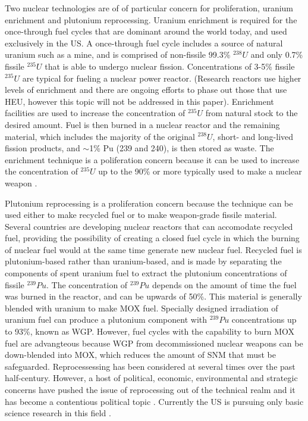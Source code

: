 Two nuclear technologies are of of particular concern for proliferation, uranium enrichment and plutonium reprocessing.  Uranium enrichment is required for the once-through fuel cycles that are dominant around the world today, and used exclusively in the \gls{US}.  A once-through fuel cycle includes a source of natural uranium such as a mine, and is comprised of non-fissile 99.3\% $^{238}U$ and only 0.7\% fissile $^{235}U$ that is able to undergo nuclear fission. Concentrations of 3-5\% fissile $^{235}U$ are typical for fueling a nuclear power reactor.  (Research reactors use higher levels of enrichment and there are ongoing efforts to phase out those that use \gls{HEU}, however this topic will not be addressed in this paper).  Enrichment facilities are used to increase the concentration of $^{235}U$ from natural stock to the desired amount.  Fuel is then burned in a nuclear reactor and the remaining material, which includes the majority of the original $^{238}U$, short- and long-lived fission products, and $\sim$1\% Pu (239 and 240), is then stored as waste.  The enrichment technique is a poliferation concern because it can be used to increase the concentration of $^{235}U$ up to the 90\% or more typically used to make a nuclear weapon \cite{_military_2014}.

Plutonium reprocessing is a proliferation concern because the technique can be used either to make recycled fuel or to make weapon-grade fissile material.  Several countries are developing nuclear reactors that can accomodate recycled fuel, providing the possibility of creating a closed fuel cycle \cite{_processing_2015} in which the burning of nuclear fuel would at the same time generate new nuclear fuel.  Recycled fuel is plutonium-based rather than uranium-based, and is made by separating the components of spent uranium fuel to extract the plutonium concentrations of fissile $^{239}Pu$.  The concentration of $^{239}Pu$ depends on the amount of time the fuel was burned in the reactor, and can be upwards of 50\%.  This material is generally  blended with uranium to make \gls{MOX} fuel.  Specially designed irradiation of uranium fuel can produce a plutonium component with $^{239}Pu$ concentrations up to 93\%, known as \gls{WGP}. However, fuel cycles with the capability to burn \gls{MOX} fuel are advangteous because \gls{WGP} from decommissioned nuclear weapons can be down-blended into \gls{MOX}, which reduces the amount of \gls{SNM} that must be safeguarded.  Reprocessessing has been considered at several times over the past half-century.  However, a host of political, economic, environmental and strategic concerns have pushed the issue of reprocessing out of the technical realm and it has become a contentious political topic \cite{rossin_policy_????}.  Currently the \gls{US} is pursuing only basic science research in this field \cite{editorial_adieu_2009}.

